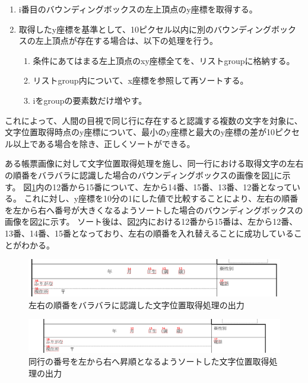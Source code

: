 \begin{enumerate}
    \item i番目のバウンディングボックスの左上頂点のy座標を取得する。
    \item 取得したy座標を基準として、10ピクセル以内に別のバウンディングボックスの左上頂点が存在する場合は、以下の処理を行う。
    \begin{enumerate}
        \item 条件にあてはまる左上頂点のxy座標全てを、リストgroupに格納する。
        \item リストgroup内について、x座標を参照して再ソートする。
        \item iをgroupの要素数だけ増やす。
    \end{enumerate}
\end{enumerate}

これによって、人間の目視で同じ行に存在すると認識する複数の文字を対象に、文字位置取得時点のy座標について、最小のy座標と最大のy座標の差が10ピクセル以上である場合を除き、正しくソートができる。

ある帳票画像に対して文字位置取得処理を施し、同一行における取得文字の左右の順番をバラバラに認識した場合のバウンディングボックスの画像を図\ref{fig:before_sorted_string}に示す。
図\ref{fig:before_sorted_string}内の12番から15番について、左から14番、15番、13番、12番となっている。
これに対し、y座標を10分の1にした値で比較することにより、左右の順番を左から右へ番号が大きくなるようソートした場合のバウンディングボックスの画像を図\ref{fig:after_sorted_string}に示す。
ソート後は、図\ref{fig:after_sorted_string}内における12番から15番は、左から12番、13番、14番、15番となっており、左右の順番を入れ替えることに成功していることがわかる。

\begin{figure}[t]
    \begin{center}
        \includegraphics[width=15cm]{image/04-implementation/before_sorted_string.png}
        \caption{左右の順番をバラバラに認識した文字位置取得処理の出力}
        \label{fig:before_sorted_string}
    \end{center}
\end{figure}

\begin{figure}[t]
    \begin{center}
        \includegraphics[width=15cm]{image/04-implementation/after_sorted_string.png}
        \caption{同行の番号を左から右へ昇順となるようソートした文字位置取得処理の出力}
        \label{fig:after_sorted_string}
    \end{center}
\end{figure}


